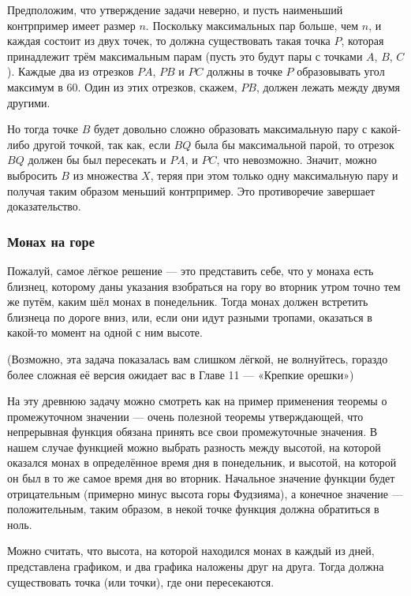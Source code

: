 Предположим, что утверждение задачи неверно, и пусть наименьший контрпример имеет размер $n$.
Поскольку максимальных пар больше, чем $n$, и каждая состоит из двух точек, то должна существовать такая точка $P$, которая принадлежит трём максимальным парам (пусть это будут пары с точками $A$, $B$, $C$).
Каждые два из отрезков $PA$, $PB$ и $PC$ должны в точке $P$ образовывать угол максимум в 60\degree.
Один из этих отрезков, скажем, $PB$, %
должен лежать между двумя другими.

Но тогда точке $B$ будет довольно сложно образовать максимальную пару с какой-либо другой точкой, так как, если $BQ$ была бы максимальной парой, то отрезок $BQ$ должен бы был пересекать и $PA$, и $PC$, что невозможно.
Значит, можно выбросить $B$ из множества $X$, теряя при этом только одну максимальную пару и получая таким образом меньший контрпример.
Это противоречие завершает доказательство.\heart

\subsubsection*{Монах на горе}%

Пожалуй, самое лёгкое решение --- это представить себе, что у монаха есть близнец, которому даны указания взобраться на гору во вторник утром точно тем же путём, каким шёл монах в понедельник.
Тогда монах должен встретить близнеца по дороге вниз, или, если они идут разными тропами, оказаться в какой-то момент на одной с ним высоте.\heart

(Возможно, эта задача показалась вам слишком лёгкой, не волнуйтесь, гораздо более сложная её версия ожидает вас в Главе 11 --- «Крепкие орешки»)

На эту древнюю задачу можно смотреть как на пример применения теоремы о промежуточном значении --- очень полезной теоремы утверждающей, что непрерывная функция обязана принять все свои промежуточные значения.
В нашем случае функцией можно выбрать разность между высотой, на которой оказался монах в определённое время дня в понедельник, и высотой, на которой он был в то же самое время дня во вторник.
Начальное значение функции будет отрицательным (примерно минус высота горы Фудзияма), а конечное значение --- положительным, таким образом, в некой точке функция должна обратиться в ноль.

Можно считать, что высота, на которой находился монах в каждый из дней, представлена графиком, и два графика наложены друг на друга.
Тогда должна существовать точка (или точки), где они пересекаются.


